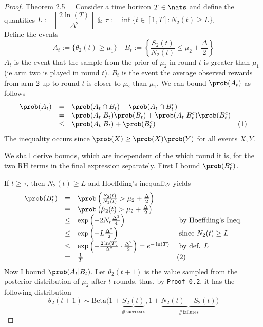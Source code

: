 \documentclass[11pt,a4paper]{article}
\begin{document}
  \begin{proof}{Theorem 2.5}
    \everymath={\displaystyle}
    Consider a time horizon $T\in\nats$ and define the quantities $L:=\left\lceil\dfrac{2\ln(T)}{\Delta^2}\right\rceil$ \&  ${\tau:=\inf\{t\in[1,T]:N_2(t)\geq L\}}$.\\
    Define the events
    \[ A_t:=\{\theta_2(t)\geq\mu_1\}\quad B_t:=\left\{\frac{S_2(t)}{N_2(t)}\leq\mu_2+\frac\Delta2\right\} \]
    $A_t$ is the event that the sample from the prior of $\mu_2$ in round $t$ is greater than $\mu_1$ (ie arm two is played in round $t$). $B_t$ is the event the average observed rewards from arm 2 up to round $t$ is closer to $\mu_2$ than $\mu_1$.
    We can bound $\prob(A_t)$ as follows
    \[\begin{array}{rcll}
      \prob(A_t)&=&\prob(A_t\cap B_t)+\prob(A_t\cap B_t^c)\\
      &=&\prob(A_t|B_t)\prob(B_t)+\prob(A_t|B_t^c)\prob(B_t^c)\\
      &\leq&\prob(A_t|B_t)+\prob(B_t^c)&(1)
    \end{array}\]
    The inequality occurs since $\prob(X)\geq\prob(X)\prob(Y)$ for all events $X,Y$.
    \par We shall derive bounds, which are independent of the which round it is, for the two RH terms in the final expression separately. First I bound $\prob(B_t^c)$.
    \par If $t\geq\tau$, then $N_2(t)\geq L$ and Hoeffding's inequality yields
    \[\begin{array}{rclll}
      \prob(B_t^c)&\equiv&\prob\left(\frac{S_2(t)}{N_2(t)}>\mu_2+\frac\Delta2\right)\\
      &\equiv&\prob\left(\hat\mu_2(t)>\mu_2+\frac\Delta2\right)\\
      &\leq&\exp\left(-2N_t\frac{\Delta^2}4\right)&\text{ by Hoeffding's Ineq.}\\
      &\leq&\exp\left(-L\frac{\Delta^2}2\right)&\text{ since }N_2(t)\geq L\\
      &\leq&\exp\left(-\frac{2\ln(T)}{\Delta^2}\cdot\frac{\Delta^2}2\right)=e^{-\ln(T)}&\text{ by def. }L\\
      &=&\frac1T&(2)
    \end{array}\]
    Now I bound $\prob(A_t|B_t)$. Let $\theta_2(t+1)$ is the value sampled from the posterior distribution of $\mu_2$ after $t$ rounds, thus, by \texttt{Proof 0.2}, it has the following distribution
    \[ \theta_2(t+1)\sim\text{Beta}\big(1+\underbrace{S_2(t)}_\text{\# successes},1+\underbrace{N_2(t)-S_2(t)}_\text{\# failures}\big) \]

\end{proof}
\end{document}
